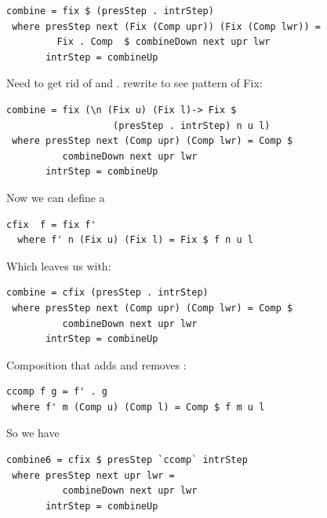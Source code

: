 \documentclass[preprint,natbib]{sigplanconf}
\begin{document}
\begin{small}%
\begin{verbatim}
combine = fix $ (presStep . intrStep) 
 where presStep next (Fix (Comp upr)) (Fix (Comp lwr)) =
         Fix . Comp  $ combineDown next upr lwr  
       intrStep = combineUp
\end{verbatim}%
\end{small}

Need to get rid of  and . rewrite to see pattern of Fix:

\begin{small}%
\begin{verbatim}
combine = fix (\n (Fix u) (Fix l)-> Fix $
                   (presStep . intrStep) n u l) 
 where presStep next (Comp upr) (Comp lwr) = Comp $ 
          combineDown next upr lwr  
       intrStep = combineUp
\end{verbatim}
\end{small}

Now we can define a 
\begin{small}
\begin{verbatim}
cfix  f = fix f' 
  where f' n (Fix u) (Fix l) = Fix $ f n u l
\end{verbatim}%
\end{small}

Which leaves us with:

\begin{small}%
\begin{verbatim}
combine = cfix (presStep . intrStep)
 where presStep next (Comp upr) (Comp lwr) = Comp $ 
          combineDown next upr lwr  
       intrStep = combineUp
\end{verbatim}%
\end{small}


Composition that adds and removes :
\begin{small}
\begin{verbatim}
ccomp f g = f' . g
 where f' m (Comp u) (Comp l) = Comp $ f m u l
\end{verbatim}%
\end{small}

So we have

\begin{small}%
\begin{verbatim}
combine6 = cfix $ presStep `ccomp` intrStep
 where presStep next upr lwr =  
          combineDown next upr lwr  
       intrStep = combineUp
\end{verbatim}%
\end{small}
\end{document}
